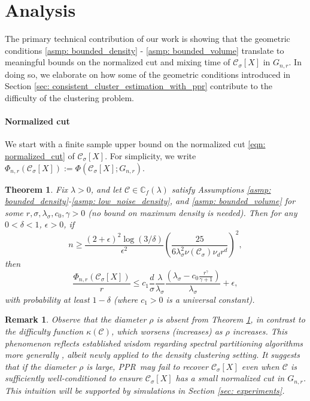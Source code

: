 \documentclass{article}
\newcommand{\1}{\mathbf{1}}
\newcommand{\Xbf}{X}             %
\newcommand{\Cbb}{\mathbb{C}}
\newcommand{\Cset}{\mathcal{C}}
\newcommand{\Csig}{\Cset_{\sigma}}
\newcommand{\pprspace}{{\sc PPR~}}
\theoremstyle{aldenthm}
\newtheorem{theorem}{Theorem}
\theoremstyle{aldenrmrk}
\newtheorem{remark}{Remark}
\begin{document}
\section{Analysis}
\label{sec: analysis}

The primary technical contribution of our work is showing that the geometric conditions \ref{asmp: bounded_density} - \ref{asmp: bounded_volume} translate to meaningful bounds on the normalized cut and mixing time of $\Csig[\Xbf]$ in $G_{n,r}$. In doing so, we elaborate on how some of the geometric conditions introduced in Section \ref{sec: consistent_cluster_estimation_with_ppr} contribute to the difficulty of the clustering problem.

\paragraph{Normalized cut} We start with a finite sample upper bound on the normalized cut \eqref{eqn: normalized_cut} of 
$\Cset_\sigma[\Xbf]$. For simplicity, we write $\Phi_{n,r}(\Csig[\Xbf]) := \Phi(\Csig[\Xbf]; G_{n,r})$.

\begin{theorem}
	\label{thm: conductance_upper_bound}
	Fix $\lambda > 0$, and let $\Cset \in \Cbb_f(\lambda)$ satisfy
	Assumptions \ref{asmp: bounded_density}-\ref{asmp: low_noise_density}, and \ref{asmp: bounded_volume} for some 
	$r, \sigma, \lambda_{\sigma}, c_0, \gamma > 0$ (no bound on maximum density is needed). 
	Then for any $0 < \delta < 1$, $\epsilon > 0$, if
	\begin{equation}
	\label{eqn: conductance_sample_complexity}
	n \geq \frac{(2+\epsilon)^2\log(3/\delta)}{\epsilon^2}\left(\frac{25}
	{6 \lambda_{\sigma}^2\nu(\Csig) \nu_d r^d}\right)^2,
	\end{equation}
	then
	\begin{equation}
	\label{eqn: conductance_additive_error_bound}
	\frac{\Phi_{n,r}(\Csig[\Xbf])}{r} \leq c_1 \frac{d}{\sigma}
	\frac{\lambda}{\lambda_{\sigma}} \frac{(\lambda_{\sigma} -
		c_0\frac{r^{\gamma}}{\gamma+1})}{\lambda_{\sigma}} + \epsilon, 
	\end{equation}
	with probability at least $1-\delta$ (where $c_1 > 0$ is a universal constant).
\end{theorem}

\begin{remark}
	\label{rmk: diameter}
	Observe that the diameter $\rho$ is absent from Theorem \ref{thm: conductance_upper_bound}, in contrast to the difficulty function $\kappa(\Cset)$, which worsens (increases) as $\rho$ increases. This phenomenon reflects established wisdom regarding spectral partitioning algorithms more generally \cite{guattery1995, hein2010}, albeit newly applied to the density clustering setting. It suggests that if the diameter $\rho$ is large, \pprspace may fail to recover $\Csig[\Xbf]$ even when $\Cset$ is sufficiently well-conditioned to ensure $\Csig[\Xbf]$ has a small normalized cut in $G_{n,r}$. This intuition will be supported by simulations in Section \ref{sec: experiments}.
\end{remark}
\end{document}
